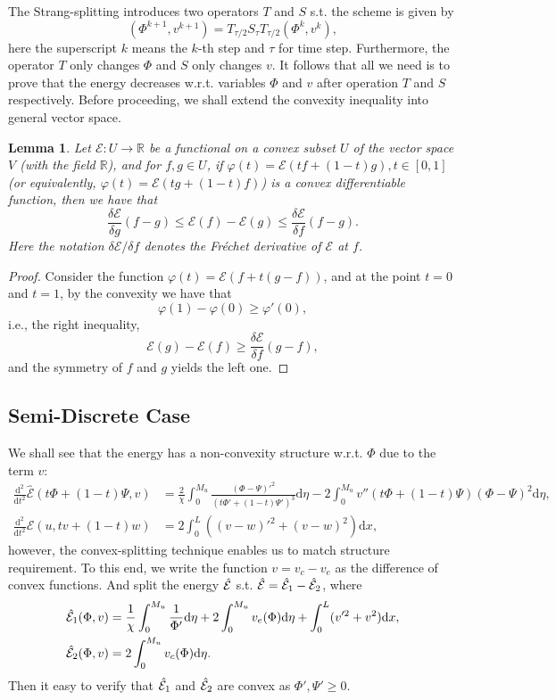 \documentclass{article}
\def\diff{\mathrm d}
\newtheorem{lemma}{Lemma}
\begin{document}
The Strang-splitting introduces two operators $T$ and $S$ s.t. the scheme is given
by
\[
  (\Phi^{k + 1}, v^{k + 1}) = T_{\tau/2}S_{\tau}T_{\tau/2}(\Phi^k, v^k),
\]
here the superscript $k$ means the $k$-th step and $\tau$ for time step.
Furthermore, the operator $T$ only changes $\Phi$ and $S$ only changes $v$.
It follows that all we need is to prove that the energy decreases w.r.t.
variables $\Phi$ and $v$ after operation $T$ and $S$ respectively.
Before proceeding, we shall extend the convexity
inequality into general vector space.
\begin{lemma}\label{lemma:convex ineq}
  Let $\mathcal E: U \to\mathbb R$ be a functional on a convex subset $U$ of the vector space $V$
  (with the field $\mathbb R$), and for $f, g\in U$, if
  $\varphi(t) = \mathcal E(tf + (1-t)g), t\in[0, 1]$ (or equivalently, $\varphi(t) = \mathcal E(tg + (1-t)f)$)
  is a convex differentiable function, then we have that
  \[
    \frac{\delta\mathcal E}{\delta g}(f - g)
    \leq \mathcal E(f) - \mathcal E(g)
    \leq\frac{\delta\mathcal E}{\delta f}(f - g).
  \]
  Here the notation $\delta\mathcal E/\delta f$ denotes the Fr\'echet derivative of
  $\mathcal E$ at $f$.
\end{lemma}
\begin{proof}
  Consider the function $\varphi(t) = \mathcal E(f + t(g - f))$, and at the point $t = 0$ and $t = 1$,
  by the convexity we have that
  \[
    \varphi(1) - \varphi(0) \geq \varphi'(0),
  \]
  i.e., the right inequality,
  \[\mathcal E(g) - \mathcal E(f) \geq \frac{\delta\mathcal E}{\delta f}(g - f),\]
  and the symmetry of $f$ and $g$ yields the left one.
\end{proof}

\subsection{Semi-Discrete Case}
We shall see that the energy has a non-convexity structure w.r.t. $\Phi$ due to the term $v$:
\[
  \begin{aligned}
    \frac{\diff^2}{\diff t^2}\hat{\mathcal E}(t\Phi + (1-t)\Psi, v)
     & = \frac 2{\chi}\int_0^{M_u} \frac{(\Phi - \Psi)'^2}{(t\Phi' + (1-t)\Psi')^3}\diff\eta
    - 2\int_0^{M_u}v''(t\Phi + (1-t)\Psi)(\Phi-\Psi)^2\diff\eta,                             \\
    \frac{\diff^2}{\diff t^2}\mathcal E(u, tv + (1-t)w)
     & =2\int_0^L \left((v-w)'^2 + (v-w)^2\right)\diff x,
  \end{aligned}
\]
however, the convex-splitting technique enables us to match structure requirement.
To this end, we write the function $v = v_c - v_e$ as the difference of convex functions.
And split the energy $\hat{\mathcal E}$ s.t. $\hat{\mathcal E} = \hat{\mathcal E}_1 - \hat{\mathcal E}_2$, where
\[
  \begin{aligned}
    \hatE_1(\Phi, v) & = \frac 1\chi \int_0^{M_u} \frac 1{\Phi'}\diff\eta
    + 2\int_0^{M_u}v_e(\Phi)\diff\eta
    + \int_0^L(v'^2 + v^2)\diff x,                                        \\
    \hatE_2(\Phi, v) & = 2\int_0^{M_u}v_c(\Phi)\diff\eta.
  \end{aligned}
\]
Then it easy to verify that $\hat{\mathcal E}_1$ and $\hat{\mathcal E}_2$ are convex
as $\Phi',\Psi'\geq 0$.
\end{document}
